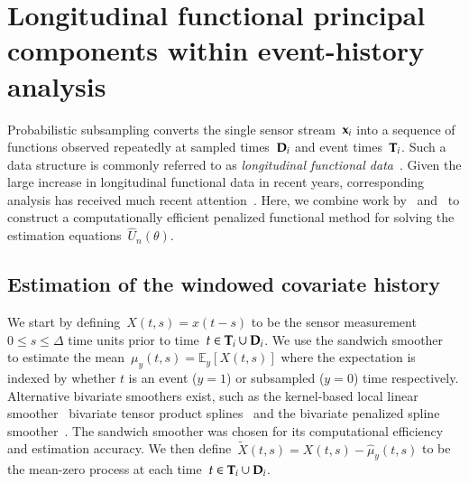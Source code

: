 \documentclass[12pt]{amsart}
\def\E{\mathcal{E}}
\def\E{\mathbb{E}}
\def\bfx{{\bf x}}
\def\bfT{{\bf T}}
\def\bfD{{\bf D}}
\begin{document}
\section{Longitudinal functional principal components within
  event-history analysis}

Probabilistic subsampling converts the single sensor stream~$\bfx_i$ into a sequence of functions observed repeatedly at sampled times~$\bfD_i$ and event times~$\bfT_i$. Such a data structure is commonly referred to as \emph{longitudinal functional data}~\citep{Xiao2013, GoldSmith2015}. Given the large increase in longitudinal functional data in recent years, corresponding analysis has received much recent attention~\citep{Morris2003, MorrisCarroll2006, Baladandayuthapani2008, Di2009, Greven2010, Staicu2010, ChenMuller2012, LiGuan2014}. Here, we combine work by~\cite{Park2018} and~\cite{Goldsmith2011} to construct a computationally efficient penalized functional method for solving the estimation equations~$\hat U_n (\theta)$.

\subsection{Estimation of the windowed covariate history}

We start by defining~$X(t,s) = x(t-s)$ to be the sensor measurement~$0 \leq s \leq \Delta$ time units prior to time~$t \in \bfT_i \cup \bfD_i$. We use the sandwich smoother~\citep{Xiao2013} to estimate the mean~$\mu_y(t,s) = \E_y [ X(t,s)]$ where the expectation is indexed by whether $t$ is an event ($y=1$) or subsampled ($y=0$) time respectively. Alternative bivariate smoothers exist, such as the kernel-based local linear smoother~\citep{Hastie2009} bivariate tensor product splines~\citep{Wood2006} and the bivariate penalized spline smoother~\citep{MarxEilers2005}. The sandwich smoother was chosen for its computational efficiency and estimation accuracy. We then define~$\tilde X(t,s) = X(t,s) - \hat \mu_y(t,s)$ to be the mean-zero process at each time~$t \in \bfT_i \cup \bfD_i$.
\end{document}
